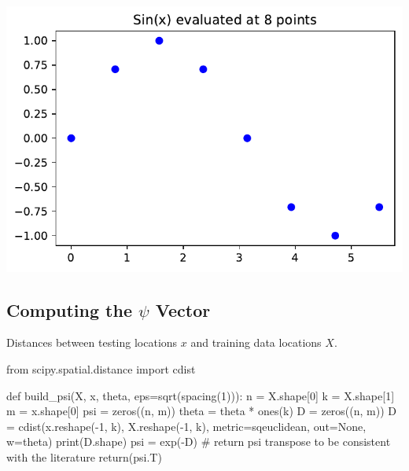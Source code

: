 \documentclass[
  letterpaper,
  DIV=11,
  numbers=noendperiod]{scrreprt}
\newenvironment{Shaded}{\begin{snugshade}}{\end{snugshade}}
\newcommand{\BuiltInTok}[1]{\textcolor[rgb]{0.00,0.23,0.31}{#1}}
\newcommand{\CommentTok}[1]{\textcolor[rgb]{0.37,0.37,0.37}{#1}}
\newcommand{\ControlFlowTok}[1]{\textcolor[rgb]{0.00,0.23,0.31}{#1}}
\newcommand{\DecValTok}[1]{\textcolor[rgb]{0.68,0.00,0.00}{#1}}
\newcommand{\ImportTok}[1]{\textcolor[rgb]{0.00,0.46,0.62}{#1}}
\newcommand{\KeywordTok}[1]{\textcolor[rgb]{0.00,0.23,0.31}{#1}}
\newcommand{\NormalTok}[1]{\textcolor[rgb]{0.00,0.23,0.31}{#1}}
\newcommand{\OperatorTok}[1]{\textcolor[rgb]{0.37,0.37,0.37}{#1}}
\newcommand{\StringTok}[1]{\textcolor[rgb]{0.13,0.47,0.30}{#1}}
\newcommand{\VariableTok}[1]{\textcolor[rgb]{0.07,0.07,0.07}{#1}}
\begin{document}
\includegraphics{006_num_gp_files/figure-pdf/cell-54-output-1.pdf}

\subsection{\texorpdfstring{Computing the \(\psi\)
Vector}{Computing the \textbackslash psi Vector}}\label{computing-the-psi-vector}

Distances between testing locations \(x\) and training data locations
\(X\).

\begin{Shaded}
\begin{Highlighting}[]
\ImportTok{from}\NormalTok{ scipy.spatial.distance }\ImportTok{import}\NormalTok{ cdist}

\KeywordTok{def}\NormalTok{ build\_psi(X, x, theta, eps}\OperatorTok{=}\NormalTok{sqrt(spacing(}\DecValTok{1}\NormalTok{))):}
\NormalTok{    n }\OperatorTok{=}\NormalTok{ X.shape[}\DecValTok{0}\NormalTok{]}
\NormalTok{    k }\OperatorTok{=}\NormalTok{ X.shape[}\DecValTok{1}\NormalTok{]}
\NormalTok{    m }\OperatorTok{=}\NormalTok{ x.shape[}\DecValTok{0}\NormalTok{]}
\NormalTok{    psi }\OperatorTok{=}\NormalTok{ zeros((n, m))}
\NormalTok{    theta }\OperatorTok{=}\NormalTok{ theta }\OperatorTok{*}\NormalTok{ ones(k)}
\NormalTok{    D }\OperatorTok{=}\NormalTok{ zeros((n, m))}
\NormalTok{    D }\OperatorTok{=}\NormalTok{ cdist(x.reshape(}\OperatorTok{{-}}\DecValTok{1}\NormalTok{, k),}
\NormalTok{              X.reshape(}\OperatorTok{{-}}\DecValTok{1}\NormalTok{, k),}
\NormalTok{              metric}\OperatorTok{=}\StringTok{\textquotesingle{}sqeuclidean\textquotesingle{}}\NormalTok{,}
\NormalTok{              out}\OperatorTok{=}\VariableTok{None}\NormalTok{,}
\NormalTok{              w}\OperatorTok{=}\NormalTok{theta)}
    \BuiltInTok{print}\NormalTok{(D.shape)}
\NormalTok{    psi }\OperatorTok{=}\NormalTok{ exp(}\OperatorTok{{-}}\NormalTok{D)}
    \CommentTok{\# return psi transpose to be consistent with the literature}
    \ControlFlowTok{return}\NormalTok{(psi.T)}
\end{Highlighting}
\end{Shaded}
\end{document}
